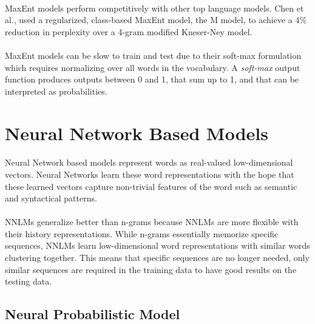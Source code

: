 \paragraph{}
MaxEnt models perform competitively with other top language models. Chen et al., used a regularized, class-based MaxEnt model, the M model, to achieve a 4\% reduction in perplexity over a 4-gram modified Kneser-Ney model.
\paragraph{}

MaxEnt models can be slow to train and test due to their soft-max formulation which requires normalizing over all words in the vocabulary. A \emph{soft-max} output function produces outputs between 0 and 1, that sum up to 1, and that can be interpreted as probabilities. 

\section{Neural Network Based Models} \label{sec:nplm}
\paragraph{}
Neural Network based models represent words as real-valued low-dimensional vectors. Neural Networks learn these word representations with the hope that these learned vectors capture non-trivial features of the word such as semantic and syntactical patterns.
\paragraph{}
NNLMs generalize better than n-grams because NNLMs are more flexible with their history representations. While n-grams essentially memorize specific sequences, NNLMs learn low-dimensional word representations with similar words clustering together. This means that specific sequences are no longer needed, only similar sequences are required in the training data to have good results on the testing data.


\subsection{Neural Probabilistic Model}
